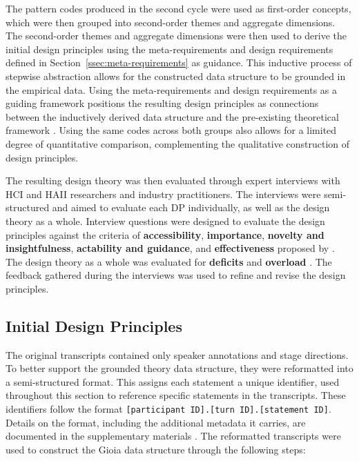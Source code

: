 The pattern codes produced in the second cycle were used as first-order concepts, which were then grouped into second-order themes and aggregate dimensions. The second-order themes and aggregate dimensions were then used to derive the initial design principles using the meta-requirements and design requirements defined in Section~\ref{ssec:meta-requirements} as guidance. This inductive process of stepwise abstraction allows for the constructed data structure to be grounded in the empirical data. Using the meta-requirements and design requirements as a guiding framework positions the resulting design principles as connections between the inductively derived data structure and the pre-existing theoretical framework \parencite[cf.][]{Gioia2013}. Using the same codes across both groups also allows for a limited degree of quantitative comparison, complementing the qualitative construction of design principles.

The resulting design theory was then evaluated through expert interviews with \ac{HCI} and \ac{HAII} researchers and industry practitioners. The interviews were semi-structured and aimed to evaluate each \ac{DP} individually, as well as the design theory as a whole. Interview questions were designed to evaluate the design principles against the criteria of \textbf{accessibility}, \textbf{importance}, \textbf{novelty and insightfulness}, \textbf{actability and guidance}, and \textbf{effectiveness} proposed by \textcite{Iivari2021}. The design theory as a whole was evaluated for \textbf{deficits} and \textbf{overload} \parencite{Janiesch2020}. The feedback gathered during the interviews was used to refine and revise the design principles.

\subsection{Initial Design Principles} \label{ssec:initial-design-principles}

The original transcripts contained only speaker annotations and stage directions. To better support the grounded theory data structure, they were reformatted into a semi-structured format. This assigns each statement a unique identifier, used throughout this section to reference specific statements in the transcripts. These identifiers follow the format \texttt{[participant ID].[turn ID].[statement ID]}. Details on the format, including the additional metadata it carries, are documented in the supplementary materials \parencite{Goepfert2025}. The reformatted transcripts were used to construct the Gioia data structure through the following steps:

